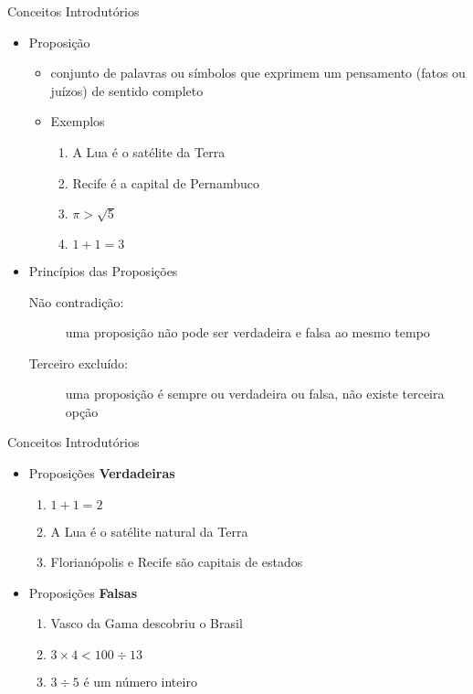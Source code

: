 \begin{frame}[t]{Conceitos Introdutórios} %
	\begin{itemize}
		\item Proposição
		   \begin{itemize}
		   \item conjunto de palavras ou símbolos que exprimem um pensamento (fatos ou juízos) de sentido completo
		   \item Exemplos
		   \begin{enumerate}
		   \item A Lua é o satélite da Terra
		   \item Recife é a capital de Pernambuco
	              \item $\pi > \sqrt{5}$
	 	   \item $1 + 1 = 3$
		   \end{enumerate}
		   \end{itemize}
		\item Princípios das Proposições
                         \begin{description}
		    \item[Não contradição:] uma proposição não pode ser verdadeira e falsa ao mesmo tempo
  		    \item[Terceiro excluído:] uma proposição é sempre ou verdadeira ou falsa, não existe terceira opção
		    \end{description}
	\end{itemize}
\end{frame}

\begin{frame}[t]{Conceitos Introdutórios} %
	\begin{itemize}
		\item Proposições {\bf Verdadeiras}
		   \begin{enumerate}
	 	   \item $1 + 1 = 2$
		   \item A Lua é o satélite natural da Terra
		   \item Florianópolis e Recife são capitais de estados
		   \end{enumerate}
		\item Proposições {\bf Falsas}
		   \begin{enumerate}
	 	   \item Vasco da Gama descobriu o Brasil
		   \item $3 \times 4 < 100 \div 13$
		   \item $3 \div 5$ é um número inteiro
		   \end{enumerate}
	\end{itemize}
\end{frame}

